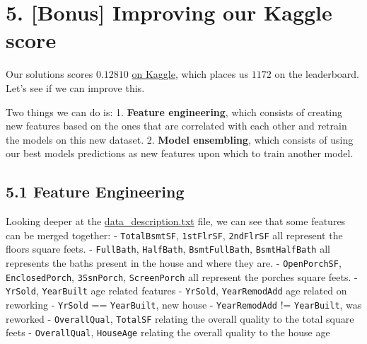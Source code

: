 \documentclass[11pt]{article}
\begin{document}
    \section{5. {[}Bonus{]} Improving our Kaggle
score}\label{bonus-improving-our-kaggle-score}

    Our solutions scores \(0.12810\)
\href{https://www.kaggle.com/competitions/house-prices-advanced-regression-techniques/leaderboard\#}{on
Kaggle}, which places us \(1172\) on the leaderboard. Let's see if we
can improve this.

Two things we can do is: 1. \textbf{Feature engineering}, which consists
of creating new features based on the ones that are correlated with each
other and retrain the models on this new dataset. 2. \textbf{Model
ensembling}, which consists of using our best models predictions as new
features upon which to train another model.

    \subsection{5.1 Feature Engineering}\label{feature-engineering}

    Looking deeper at the
\href{./data/data_description.txt}{data\_description.txt} file, we can
see that some features can be merged together: - \texttt{TotalBsmtSF},
\texttt{1stFlrSF}, \texttt{2ndFlrSF} all represent the floors square
feets. - \texttt{FullBath}, \texttt{HalfBath}, \texttt{BsmtFullBath},
\texttt{BsmtHalfBath} all represents the baths present in the house and
where they are. - \texttt{OpenPorchSF}, \texttt{EnclosedPorch},
\texttt{3SsnPorch}, \texttt{ScreenPorch} all represent the porches
square feets. - \texttt{YrSold}, \texttt{YearBuilt} age related features
- \texttt{YrSold}, \texttt{YearRemodAdd} age related on reworking -
\texttt{YrSold} == \texttt{YearBuilt}, new house - \texttt{YearRemodAdd}
!= \texttt{YearBuilt}, was reworked - \texttt{OverallQual},
\texttt{TotalSF} relating the overall quality to the total square feets
- \texttt{OverallQual}, \texttt{HouseAge} relating the overall quality
to the house age
\end{document}
